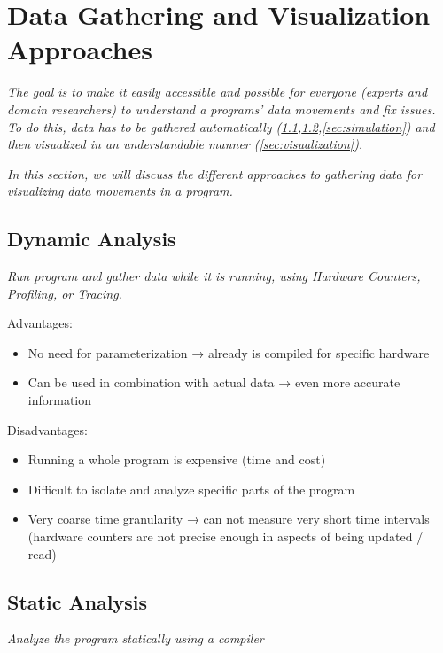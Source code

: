 \section{Data Gathering and Visualization Approaches}\label{sec:methods}
\textit{The goal is to make it easily accessible and possible for everyone (experts and domain researchers) to understand a programs' data movements and fix issues. To do this, data has to be gathered automatically (\ref{sec:dynamic_analysis},\ref{sec:static_analysis},\ref{sec:simulation}) and then visualized in an understandable manner (\ref{sec:visualization}).}

\textit{In this section, we will discuss the different approaches to gathering data for visualizing data movements in a program.}

\subsection{Dynamic Analysis}\label{sec:dynamic_analysis}
\textit{Run program and gather data while it is running, using Hardware Counters, Profiling, or Tracing.}
\cite{gimenez2017memaxes,moreta2007visualizing,bhatele2012novel,mckinley1999quantifying,adhianto2010hpctoolkit}

Advantages:
\begin{itemize}
  \item No need for parameterization → already is compiled for specific hardware
  \item Can be used in combination with actual data → even more accurate information
\end{itemize}
Disadvantages:
\begin{itemize}
  \item Running a whole program is expensive (time and cost)
  \item Difficult to isolate and analyze specific parts of the program
  \item Very coarse time granularity → can not measure very short time intervals (hardware counters are not precise enough in aspects of being updated / read)
\end{itemize}

\subsection{Static Analysis}\label{sec:static_analysis}
\textit{Analyze the program statically using a compiler}
\cite{schaad2022boosting,schaad2021boosting,ben2019statefulSDFG,matwin1985prograph,kodosky2020labview,calotoiu2022lifting,ben2023bridging}

